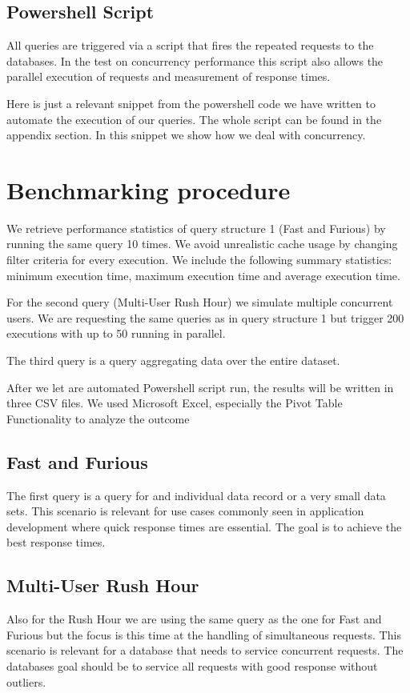 \documentclass[runningheads]{llncs}
\begin{document}
\subsection{Powershell Script}
All queries are triggered via a script that fires the repeated requests to the databases. In the test on concurrency performance this script also allows the parallel execution of requests and measurement of response times.  

Here is just a relevant snippet from the powershell code we have written to automate the execution of our queries. The whole script can be found in the appendix section. In this snippet we show how we deal with concurrency.



\section{Benchmarking procedure}

We retrieve performance statistics of query structure 1 (Fast and Furious) by running the same query 10 times. We avoid unrealistic cache usage by changing filter criteria for every execution. We include the following summary statistics: minimum execution time, maximum execution time and average execution time. 

For the second query (Multi-User Rush Hour) we simulate multiple concurrent users. We are requesting the same queries as in query structure 1 but trigger 200 executions with up to 50 running in parallel. 

The third query is a query aggregating data over the entire dataset.

After we let are automated Powershell script run, the results will be written in three CSV files. We used Microsoft Excel, especially the Pivot Table Functionality to analyze the outcome

\subsection{Fast and Furious}
The first query is a query for and individual data record or a very small data sets. This scenario is relevant for use cases commonly seen in application development where quick response times are essential. The goal is to achieve the best response times. 
\subsection{Multi-User Rush Hour}
Also for the Rush Hour we are using the same query as the one for Fast and Furious but the focus is this time at the handling of simultaneous requests. This scenario is relevant for a database that needs to service concurrent requests. The databases goal should be to service all requests with good response without outliers.
\end{document}
